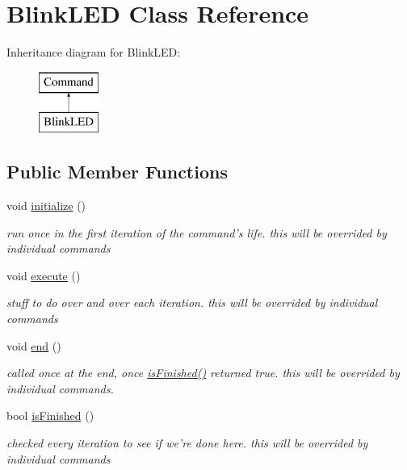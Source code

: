 \hypertarget{classBlinkLED}{\section{Blink\-L\-E\-D Class Reference}
\label{classBlinkLED}
}
Inheritance diagram for Blink\-L\-E\-D\-:\begin{figure}[H]
\begin{center}
\leavevmode
\includegraphics[height=2.000000cm]{classBlinkLED}
\end{center}
\end{figure}
\subsection*{Public Member Functions}
\begin{DoxyCompactItemize}
\item 
\hypertarget{classBlinkLED_adc66eb9bd3f5f7f93eb4e3a534b66d8a}{void \hyperlink{classBlinkLED_adc66eb9bd3f5f7f93eb4e3a534b66d8a}{initialize} ()}\label{classBlinkLED_adc66eb9bd3f5f7f93eb4e3a534b66d8a}

\begin{DoxyCompactList}\small\item\em run once in the first iteration of the command's life. this will be overrided by individual commands \end{DoxyCompactList}\item 
\hypertarget{classBlinkLED_ac7558fcb54cec351245b301d47c0cc87}{void \hyperlink{classBlinkLED_ac7558fcb54cec351245b301d47c0cc87}{execute} ()}\label{classBlinkLED_ac7558fcb54cec351245b301d47c0cc87}

\begin{DoxyCompactList}\small\item\em stuff to do over and over each iteration. this will be overrided by individual commands \end{DoxyCompactList}\item 
\hypertarget{classBlinkLED_a12866e157f0a19e78dc9169a98774993}{void \hyperlink{classBlinkLED_a12866e157f0a19e78dc9169a98774993}{end} ()}\label{classBlinkLED_a12866e157f0a19e78dc9169a98774993}

\begin{DoxyCompactList}\small\item\em called once at the end, once \hyperlink{classBlinkLED_a44ee1f75ceef08cacdcc9392aa1f81ab}{is\-Finished()} returned true. this will be overrided by individual commands. \end{DoxyCompactList}\item 
bool \hyperlink{classBlinkLED_a44ee1f75ceef08cacdcc9392aa1f81ab}{is\-Finished} ()
\begin{DoxyCompactList}\small\item\em checked every iteration to see if we're done here. this will be overrided by individual commands \end{DoxyCompactList}\end{DoxyCompactItemize}
